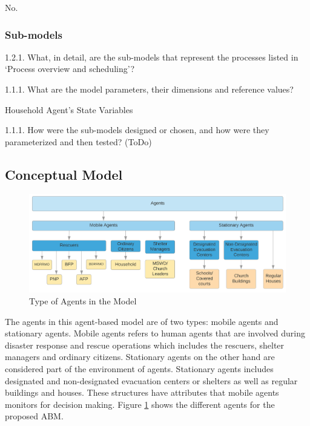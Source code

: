 \documentclass[runningheads]{llncs}
\begin{document}
No.

\subsubsection{Sub-models}

1.2.1.	What, in detail, are the sub-models that represent the processes listed in ‘Process overview and scheduling’?

1.1.1.	What are the model parameters, their dimensions and reference values?

Household Agent’s State Variables


1.1.1.	How were the sub-models designed or chosen, and how were they parameterized and then tested?
(ToDo)



\subsection{Conceptual Model}

\begin{figure}[!ht]
    \centering
    \includegraphics[scale = 0.30]{_abms_agents.png}
	\caption{Type of Agents in the Model}
	\label{fig:agent_types}
\end{figure}

The agents in this agent-based model are of two types: mobile agents and stationary agents. Mobile agents refers to human agents that are involved during disaster response and rescue operations which includes the rescuers, shelter managers and ordinary citizens. Stationary agents on the other hand are considered part of the environment of agents. Stationary agents includes designated and non-designated evacuation centers or shelters as well as regular buildings and houses. These structures have attributes that mobile agents monitors for decision making. Figure \ref{fig:agent_types} shows the different agents for the proposed ABM. 
\end{document}
